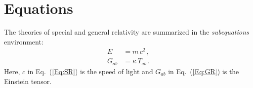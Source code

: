 \chapter{Equations}\label{Ch:equation}

The theories of special and general relativity are summarized in
the \textit{subequations} environment:
\begin{subequations}
\begin{align}
    E &= m\,c^2\,,\label{Eq:SR}\\
    G_{ab} &=\kappa\, T_{ab}\,.\label{Eq:GR}
\end{align}
    \label{eqn:Relativity}
\end{subequations}
Here, $c$ in Eq.~(\ref{Eq:SR}) is the speed of light and $G_{ab}$ in Eq.~(\ref{Eq:GR}) is the Einstein
tensor.
